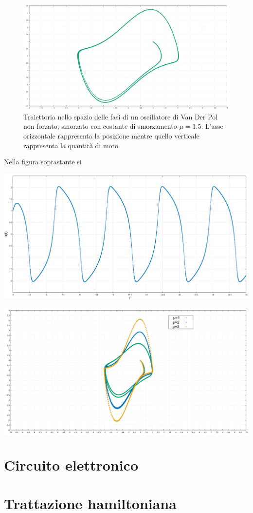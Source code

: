 \documentclass[12pt]{article}
\begin{document}
\begin{center}
	\begin{figure}[h]
		\includegraphics[scale=0.4]{mu1-5}
	\caption{Traiettoria nello spazio delle fasi di un oscillatore di Van Der Pol non forzato, smorzato con costante di smorzamento $\mu = 1.5$. L'asse orizzontale rappresenta la posizione mentre quello verticale rappresenta la quantità di moto.}
	\end{figure}
\end{center}
Nella figura soprastante si 
\begin{center}
	\includegraphics[scale=0.38]{Andamento temporale}
\end{center}

\begin{center}
	\includegraphics[scale=0.4]{mu123}
\end{center}
\section{Circuito elettronico}

\section{Trattazione hamiltoniana}
\end{document}
